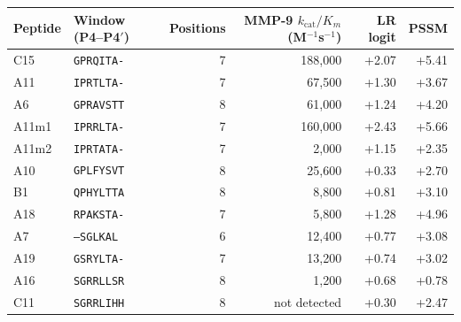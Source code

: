 \begin{tabular}{@{}llrrrr@{}}\toprule
Peptide & Window (P4--P4$'$) & Positions & MMP-9 $k_\mathrm{cat}/K_m$ (M$^{-1}$s$^{-1}$) & LR logit & PSSM \\\midrule
C15 & \texttt{GPRQITA-} & 7 & 188{,}000 & +2.07 & +5.41 \\
A11 & \texttt{IPRTLTA-} & 7 & 67{,}500 & +1.30 & +3.67 \\
A6 & \texttt{GPRAVSTT} & 8 & 61{,}000 & +1.24 & +4.20 \\
A11m1 & \texttt{IPRRLTA-} & 7 & 160{,}000 & +2.43 & +5.66 \\
A11m2 & \texttt{IPRTATA-} & 7 & 2{,}000 & +1.15 & +2.35 \\
A10 & \texttt{GPLFYSVT} & 8 & 25{,}600 & +0.33 & +2.70 \\
B1 & \texttt{QPHYLTTA} & 8 & 8{,}800 & +0.81 & +3.10 \\
A18 & \texttt{RPAKSTA-} & 7 & 5{,}800 & +1.28 & +4.96 \\
A7 & \texttt{--SGLKAL} & 6 & 12{,}400 & +0.77 & +3.08 \\
A19 & \texttt{GSRYLTA-} & 7 & 13{,}200 & +0.74 & +3.02 \\
A16 & \texttt{SGRRLLSR} & 8 & 1{,}200 & +0.68 & +0.78 \\
C11 & \texttt{SGRRLIHH} & 8 & not detected & +0.30 & +2.47 \\
\bottomrule\end{tabular}
